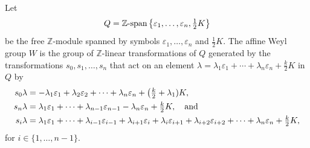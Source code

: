 \documentclass[11pt]{article}
\theoremstyle{plain}
\theoremstyle{definition}
\theoremstyle{remark}
\numberwithin{equation}{section}
\def\ZZ{\mathbb{Z}}
\newcounter{r}
\newcounter{s}
\begin{document}
Let
\begin{equation}
Q = \hbox{$\ZZ$-span}\left\{ \varepsilon_1, \ldots, \varepsilon_n, \hbox{$\frac12$} K \right\}
\label{eq:Qdef}
\end{equation}
be the free $\ZZ$-module spanned by symbols $\varepsilon_1, \ldots, \varepsilon_n$ and $\frac12 K$.
The affine Weyl group $W$ is the group of $\ZZ$-linear transformations of $Q$
generated by the transformations $s_0, s_1, \ldots, s_n$ that act on an element $\lambda = \lambda_1 \varepsilon_1 + \cdots + \lambda_n \varepsilon_n + \frac{k}{2}K$ in $Q$ by
\begin{align}
s_0 \lambda &= - \lambda_1\varepsilon_1 + \lambda_2\varepsilon_2
+\cdots+\lambda_n \varepsilon_n + \big(\hbox{$\frac{k}{2}$}+\lambda_1) K,
\nonumber
\\
s_n \lambda &= \lambda_1\varepsilon_1+\cdots +\lambda_{n-1}\varepsilon_{n-1}
-\lambda_n \varepsilon_n + \hbox{$\frac{k}{2}$}K, \quad\hbox{and}
\label{lvl0onaZ}
\\
s_i \lambda &= \lambda_1\varepsilon_1 + \cdots + \lambda_{i-1}\varepsilon_{i-1}
+\lambda_{i+1}\varepsilon_i+\lambda_i \varepsilon_{i+1} + \lambda_{i+2}\varepsilon_{i+2}+\cdots +
\lambda_n\varepsilon_n + \hbox{$\frac{k}{2}$} K,
\nonumber
\end{align}
for $i\in \{1, \ldots, n-1\}$.
\end{document}
